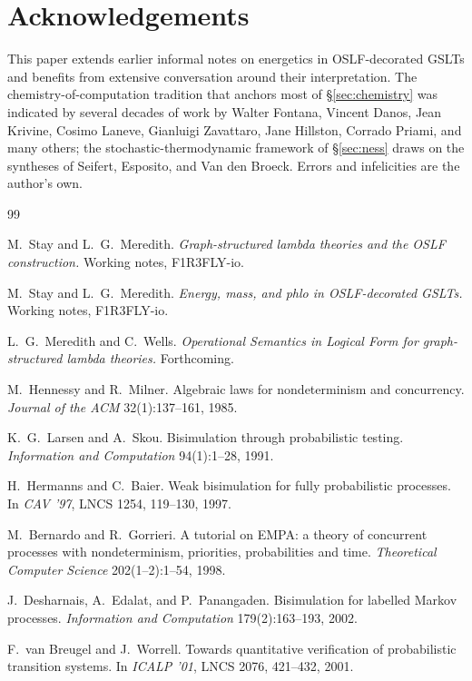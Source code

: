 \documentclass[11pt]{article}
\theoremstyle{plain}
\theoremstyle{definition}
\theoremstyle{remark}
\begin{document}
\section*{Acknowledgements}

This paper extends earlier informal notes on energetics in OSLF-decorated GSLTs and benefits from extensive conversation around their interpretation. The chemistry-of-computation tradition that anchors most of \S\ref{sec:chemistry} was indicated by several decades of work by Walter Fontana, Vincent Danos, Jean Krivine, Cosimo Laneve, Gianluigi Zavattaro, Jane Hillston, Corrado Priami, and many others; the stochastic-thermodynamic framework of \S\ref{sec:ness} draws on the syntheses of Seifert, Esposito, and Van den Broeck. Errors and infelicities are the author's own.

\begin{thebibliography}{99}

M.~Stay and L.~G.~Meredith. \emph{Graph-structured lambda theories and the OSLF construction.} Working notes, F1R3FLY-io.

M.~Stay and L.~G.~Meredith. \emph{Energy, mass, and phlo in OSLF-decorated GSLTs.} Working notes, F1R3FLY-io.

L.~G.~Meredith and C.~Wells. \emph{Operational Semantics in Logical Form for graph-structured lambda theories.} Forthcoming.

M.~Hennessy and R.~Milner. Algebraic laws for nondeterminism and concurrency. \emph{Journal of the ACM} 32(1):137--161, 1985.

K.~G.~Larsen and A.~Skou. Bisimulation through probabilistic testing. \emph{Information and Computation} 94(1):1--28, 1991.

H.~Hermanns and C.~Baier. Weak bisimulation for fully probabilistic processes. In \emph{CAV '97}, LNCS 1254, 119--130, 1997.

M.~Bernardo and R.~Gorrieri. A tutorial on EMPA: a theory of concurrent processes with nondeterminism, priorities, probabilities and time. \emph{Theoretical Computer Science} 202(1--2):1--54, 1998.

J.~Desharnais, A.~Edalat, and P.~Panangaden. Bisimulation for labelled Markov processes. \emph{Information and Computation} 179(2):163--193, 2002.

F.~van Breugel and J.~Worrell. Towards quantitative verification of probabilistic transition systems. In \emph{ICALP '01}, LNCS 2076, 421--432, 2001.


\end{thebibliography}
\end{document}
